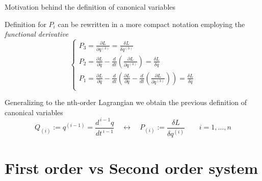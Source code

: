\documentclass[10pt]{beamer}
\begin{document}
  \begin{frame}{Motivation behind the definition of canonical variables}
    \begin{alertblock}{}
      Definition for $P_i$ can be rewritten in a more compact notation employing
      the \emph{functional derivative}
      \begin{equation*}
        \begin{cases}
          P_3  = \frac{\partial L}{\partial q^{(3)}}
               = \frac{\delta L}{\delta q^{(3)}} \\
          P_2  = \frac{\partial L}{\partial \ddot{q}} -
                 \frac{d}{dt} \left(
                   \frac{\partial L}{\partial q^{(3)}}
                 \right)
               = \frac{\delta L}{\delta \ddot{q}} \\
          P_1  = \frac{\partial L}{\partial \dot{q}} -
                 \frac{d}{dt} \left(
                   \frac{\partial L}{\partial \ddot{q}} -
                   \frac{d}{dt} \left(
                     \frac{\partial L}{\partial q^{(3)}}
                    \right)
                  \right)
               = \frac{\delta L}{\delta \dot{q}} \\
        \end{cases}
      \end{equation*}

      Generalizing to the nth-order Lagrangian we obtain the previous definition
      of canonical variables
      \begin{equation*}
        Q_{(i)} := q^{(i-1)} = \frac{d^{\, i-1} q}{dt^{\, i-1}}
        \quad \leftrightarrow \quad
        P_{(i)} := \frac{\delta L}{\delta q^{(i)}}
        \qquad i = 1, \ldots, n
      \end{equation*}
    \end{alertblock}
  \end{frame}

  \section{First order vs Second order system}
\end{document}
